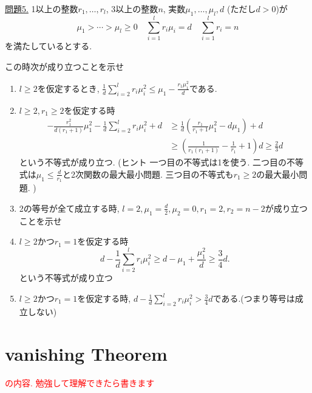 \documentclass[dvipdfmx,a4paper,11pt]{article} %
\theoremstyle{definition}
\theoremstyle{remark}
\numberwithin{equation}{section}
\newcommand{\xr}[1]{\textcolor{red}{#1}}
\begin{document}
\underline{問題5.} 
1以上の整数$r_1, \ldots, r_l$, 3以上の整数$n$, 実数$\mu_1, \ldots, \mu_l, d$ (ただし$d>0$)が
\[
\mu_1 > \cdots > \mu_l \geq 0
\quad
\sum_{i=1}^{l}r_i\mu_i=d
\quad 
\sum_{i=1}^{l}r_i=n
\]
を満たしているとする. 

この時次が成り立つことを示せ
\begin{enumerate}
\item  $l\ge 2$を仮定するとき, $\frac{1}{d} \sum_{i=2}^{l}r_i \mu_i^2 \le \mu_1 - \frac{r_1 \mu_1^{2}}{d}$である.
\item $l \ge 2, r_1\ge 2$を仮定する時
\begin{align*}
-\frac{r_1^2}{d(r_1+1)}\mu_1^2
-\frac{1}{d} \sum_{i=2}^{l}r_i \mu_i^2
+d
&\ge
\frac{1}{d}\left(
\frac{r_1}{r_1+1}\mu_1^2
-
d\mu_1
\right)
+d
\\
&\ge
\left(
\frac{1}{r_1(r_1+1)}-\frac{1}{r_1}+1
\right)d
\ge \frac{2}{3}d
\end{align*}
という不等式が成り立つ. (ヒント 一つ目の不等式は1を使う. 二つ目の不等式は$\mu_1 \le \frac{d}{r_1}$と2次関数の最大最小問題. 三つ目の不等式も$r_1 \ge 2$の最大最小問題. )
\item 2の等号が全て成立する時, $l=2,\mu_1=\frac{d}{2}, \mu_2=0,r_1=2,r_2=n-2$が成り立つことを示せ
\item $l\ge 2$かつ$r_1=1$を仮定する時
$$
d
-
\frac{1}{d} \sum_{i=2}^{l}r_i \mu_i^2 
\geq
d-\mu_1+\frac{\mu_1^2}{d} \geq
\frac{3}{4}d .
$$
という不等式が成り立つ
\item $l\ge 2$かつ$r_1=1$を仮定する時, $d-\frac{1}{d} \sum_{i=2}^{l}r_i \mu_i^2 >\frac{3}{4}d $である.(つまり等号は成立しない) 
\end{enumerate}

\newpage





\section{vanishing Theorem}
\xr{\cite[3章]{Kob14}の内容. 勉強して理解できたら書きます} 
\end{document}
